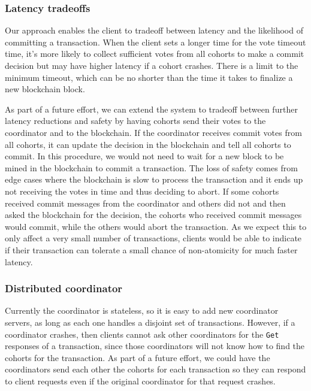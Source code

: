\documentclass[11pt,sigplan,screen,nonacm]{acmart}
\begin{document}
\subsubsection{Latency tradeoffs}
Our approach enables the client to tradeoff between latency and the likelihood of committing a transaction. When the client sets a longer time for the vote timeout time, it’s more likely to collect sufficient votes from all cohorts to make a commit decision but may have higher latency if a cohort crashes. There is a limit to the minimum timeout, which can be no shorter than the time it takes to finalize a new blockchain block.

As part of a future effort, we can extend the system to tradeoff between further latency reductions and safety by having cohorts send their votes to the coordinator and to the blockchain. If the coordinator receives commit votes from all cohorts, it can update the decision in the blockchain and tell all cohorts to commit. In this procedure, we would not need to wait for a new block to be mined in the blockchain to commit a transaction. The loss of safety comes from edge cases where the blockchain is slow to process the transaction and it ends up not receiving the votes in time and thus deciding to abort. If some cohorts received commit messages from the coordinator and others did not and then asked the blockchain for the decision, the cohorts who received commit messages would commit, while the others would abort the transaction. As we expect this to only affect a very small number of transactions, clients would be able to indicate if their transaction can tolerate a small chance of non-atomicity for much faster latency.

\subsubsection{Distributed coordinator}
Currently the coordinator is stateless, so it is easy to add new coordinator servers, as long as each one handles a disjoint set of transactions. However, if a coordinator crashes, then clients cannot ask other coordinators for the \texttt{Get} responses of a transaction, since those coordinators will not know how to find the cohorts for the transaction. As part of a future effort, we could have the coordinators send each other the cohorts for each transaction so they can respond to client requests even if the original coordinator for that request crashes.



\end{document}
